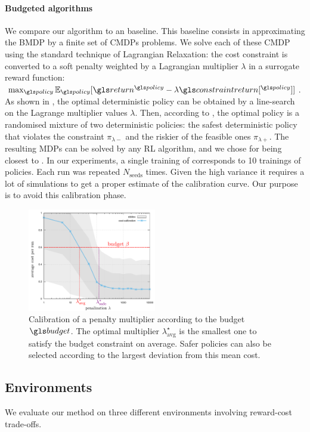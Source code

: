 \paragraph{Budgeted algorithms} We compare our \BFTQ algorithm to an \FTQl baseline. This baseline consists in approximating the BMDP by a finite set of CMDPs problems. We solve each of these CMDP using the standard technique of Lagrangian Relaxation: the cost constraint is converted to a soft penalty weighted by a Lagrangian multiplier $\lambda$ in a surrogate reward function: $\max_{\policy} \expectedvalue_{\policy}[\return^{\policy} - \lambda \constraintreturn[^{\policy}]]$.
As shown in , the optimal deterministic policy can be obtained by a line-search on the Lagrange multiplier values $\lambda$.
Then, according to \citet[Theorem 4.4]{BEUTLER1985236}, the optimal policy is a randomised mixture of two deterministic policies: the safest deterministic policy that violates the constraint $\pi_{\lambda-}$ and the riskier of the feasible ones $\pi_{\lambda+}$.
The resulting \glspl{MDP} can be solved by any RL algorithm, and we chose \FTQ for being closest to \BFTQ.
In our experiments, a single training of \BFTQ corresponds to 10 trainings of \FTQl policies. Each run was repeated $N_{\text{seeds}}$ times. Given the high variance it requires a lot of simulations to get a proper estimate of the calibration curve. Our purpose is to avoid this calibration phase.

\begin{figure}[tp]
	\centering
	\includegraphics[width=0.5\textwidth]{img/CalibrationExample}
	\caption{Calibration of a penalty multiplier according to the budget $\budget$. The optimal multiplier $\lambda^{\star}_{\text{avg}}$ is the smallest one to satisfy the budget constraint on average. Safer policies can also be selected according to the largest deviation from this mean cost.}
	\label{fig:Lagrangian}
\end{figure}


\subsection{Environments}
\label{subsec:environments}
We evaluate our method on three different environments involving reward-cost trade-offs.

